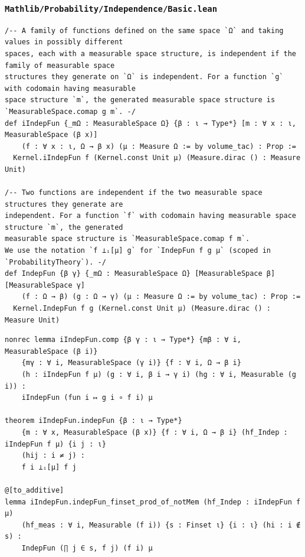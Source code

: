 \subsubsection{\texttt{Mathlib/Probability/Independence/Basic.lean}}
\begin{lstlisting}[language=lean]
/-- A family of functions defined on the same space `Ω` and taking values in possibly different
spaces, each with a measurable space structure, is independent if the family of measurable space
structures they generate on `Ω` is independent. For a function `g` with codomain having measurable
space structure `m`, the generated measurable space structure is `MeasurableSpace.comap g m`. -/
def iIndepFun {_mΩ : MeasurableSpace Ω} {β : ι → Type*} [m : ∀ x : ι, MeasurableSpace (β x)]
    (f : ∀ x : ι, Ω → β x) (μ : Measure Ω := by volume_tac) : Prop :=
  Kernel.iIndepFun f (Kernel.const Unit μ) (Measure.dirac () : Measure Unit)

/-- Two functions are independent if the two measurable space structures they generate are
independent. For a function `f` with codomain having measurable space structure `m`, the generated
measurable space structure is `MeasurableSpace.comap f m`.
We use the notation `f ⟂ᵢ[μ] g` for `IndepFun f g μ` (scoped in `ProbabilityTheory`). -/
def IndepFun {β γ} {_mΩ : MeasurableSpace Ω} [MeasurableSpace β] [MeasurableSpace γ]
    (f : Ω → β) (g : Ω → γ) (μ : Measure Ω := by volume_tac) : Prop :=
  Kernel.IndepFun f g (Kernel.const Unit μ) (Measure.dirac () : Measure Unit)
\end{lstlisting}

\begin{lstlisting}[language=lean]
nonrec lemma iIndepFun.comp {β γ : ι → Type*} {mβ : ∀ i, MeasurableSpace (β i)}
    {mγ : ∀ i, MeasurableSpace (γ i)} {f : ∀ i, Ω → β i}
    (h : iIndepFun f μ) (g : ∀ i, β i → γ i) (hg : ∀ i, Measurable (g i)) :
    iIndepFun (fun i ↦ g i ∘ f i) μ

theorem iIndepFun.indepFun {β : ι → Type*}
    {m : ∀ x, MeasurableSpace (β x)} {f : ∀ i, Ω → β i} (hf_Indep : iIndepFun f μ) {i j : ι}
    (hij : i ≠ j) :
    f i ⟂ᵢ[μ] f j

@[to_additive]
lemma iIndepFun.indepFun_finset_prod_of_notMem (hf_Indep : iIndepFun f μ)
    (hf_meas : ∀ i, Measurable (f i)) {s : Finset ι} {i : ι} (hi : i ∉ s) :
    IndepFun (∏ j ∈ s, f j) (f i) μ
\end{lstlisting}
\newpage

